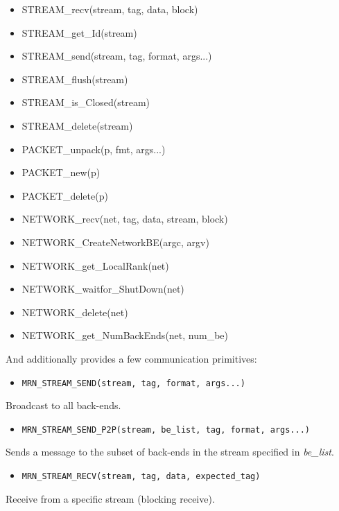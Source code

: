 \documentclass[twoside,a4,english,11pt]{book}
\begin{document}
\begin{itemize}
 \item STREAM\_recv(stream, tag, data, block)      
 \item STREAM\_get\_Id(stream)                     
 \item STREAM\_send(stream, tag, format, args...)   
 \item STREAM\_flush(stream)                      
 \item STREAM\_is\_Closed(stream)              
 \item STREAM\_delete(stream)                      
 \item PACKET\_unpack(p, fmt, args...)            
 \item PACKET\_new(p)                             
 \item PACKET\_delete(p)                              
 \item NETWORK\_recv(net, tag, data, stream, block) 
 \item NETWORK\_CreateNetworkBE(argc, argv)         
 \item NETWORK\_get\_LocalRank(net)                  
 \item NETWORK\_waitfor\_ShutDown(net)               
 \item NETWORK\_delete(net)                         
 \item NETWORK\_get\_NumBackEnds(net, num\_be)          
\end{itemize}

And additionally provides a few communication primitives: 

\begin{itemize}
\item 
\begin{lstlisting} 
MRN_STREAM_SEND(stream, tag, format, args...) 
\end{lstlisting} 
\end{itemize}
Broadcast to all back-ends.

\begin{itemize}
\item 
\begin{lstlisting} 
MRN_STREAM_SEND_P2P(stream, be_list, tag, format, args...)  
\end{lstlisting} 
\end{itemize}
Sends a message to the subset of back-ends in the stream specified in \emph{be\_list}.
 
\begin{itemize}
\item 
\begin{lstlisting} 
MRN_STREAM_RECV(stream, tag, data, expected_tag)
\end{lstlisting} 
\end{itemize}
Receive from a specific stream (blocking receive).
 
\end{document}
